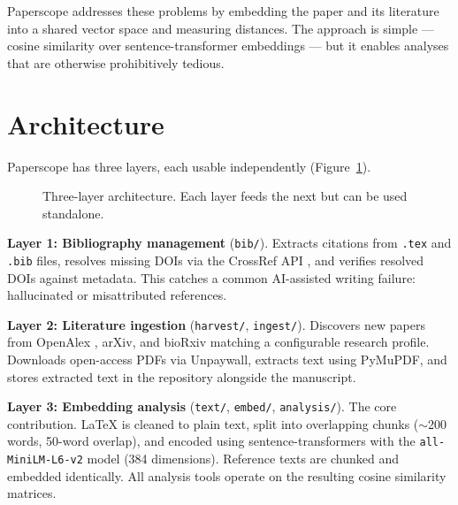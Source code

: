 \documentclass[11pt,a4paper]{article}
\begin{document}
Paperscope addresses these problems by embedding the paper and its literature into a shared vector space and measuring distances. The approach is simple --- cosine similarity over sentence-transformer embeddings --- but it enables analyses that are otherwise prohibitively tedious.

\section{Architecture}

Paperscope has three layers, each usable independently (Figure~\ref{fig:arch}).

\begin{figure}[H]
\centering
{}
\caption{Three-layer architecture. Each layer feeds the next but can be used standalone.}
\label{fig:arch}
\end{figure}

\textbf{Layer 1: Bibliography management} (\texttt{bib/}). Extracts citations from \texttt{.tex} and \texttt{.bib} files, resolves missing DOIs via the CrossRef API \citep{crossref2024}, and verifies resolved DOIs against metadata. This catches a common AI-assisted writing failure: hallucinated or misattributed references.

\textbf{Layer 2: Literature ingestion} (\texttt{harvest/}, \texttt{ingest/}). Discovers new papers from OpenAlex \citep{priem2022openalex}, arXiv, and bioRxiv matching a configurable research profile. Downloads open-access PDFs via Unpaywall, extracts text using PyMuPDF, and stores extracted text in the repository alongside the manuscript.

\textbf{Layer 3: Embedding analysis} (\texttt{text/}, \texttt{embed/}, \texttt{analysis/}). The core contribution. LaTeX is cleaned to plain text, split into overlapping chunks ($\sim$200 words, 50-word overlap), and encoded using sentence-transformers \citep{reimers2019sentence} with the \texttt{all-MiniLM-L6-v2} model (384 dimensions). Reference texts are chunked and embedded identically. All analysis tools operate on the resulting cosine similarity matrices.
\end{document}
